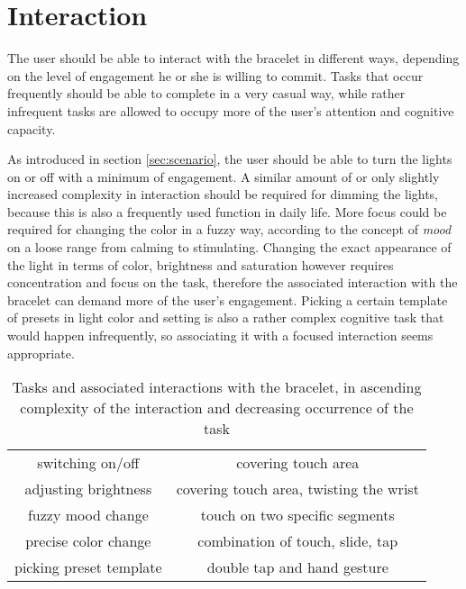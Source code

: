 \chapter{Interaction}
The user should be able to interact with the bracelet in different ways, depending on the level of engagement he or she is willing to commit. Tasks that occur frequently should be able to complete in a very casual way, while rather infrequent tasks are allowed to occupy more of the user's attention and cognitive capacity.

As introduced in section \ref{sec:scenario}, the user should be able to turn the lights on or off with a minimum of engagement. A similar amount of or only slightly increased complexity in interaction should be required for dimming the lights, because this is also a frequently used function in daily life. More focus could be required for changing the color in a fuzzy way, according to the concept of \textit{mood} on a loose range from calming to stimulating. Changing the exact appearance of the light in terms of color, brightness and saturation however requires concentration and focus on the task, therefore the associated interaction with the bracelet can demand more of the user's engagement. Picking a certain template of presets in light color and setting is also a rather complex cognitive task that would happen infrequently, so associating it with a focused interaction seems appropriate.

\begin{table}
	\myfloatalign
	\begin{tabularx}{.95\textwidth}{cc}
		\toprule
		\tableheadline{Task} & \tableheadline{Associated Interaction}\\ 
		\midrule
		switching on/off & covering touch area\\
		adjusting brightness & covering touch area, twisting the wrist\\
		fuzzy mood change & touch on two specific segments\\
		precise color change & combination of touch, slide, tap\\
		picking preset template & double tap and hand gesture\\
		\bottomrule
	\end{tabularx}
	\caption[Tasks and associated interactions with the bracelet]{Tasks and associated interactions with the bracelet, in ascending complexity of the interaction and decreasing occurrence of the task}  \label{tab:interaction}
\end{table}

